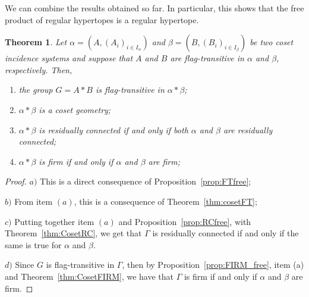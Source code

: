 \documentclass[11pt,letterpaper]{amsart}
\newtheorem{thm}[prop]{Theorem}
\begin{document}
We can combine the results obtained so far. In particular, this shows that the free product of regular hypertopes is a regular hypertope.

\begin{thm}\label{thm:FP_a)FT_b)Geo_c)_RC_b)_FIRM}
    Let $\alpha=(A,(A_i)_{i\in I_\alpha})$ and $\beta=(B,(B_i)_{i\in I_\beta})$ be two coset incidence systems and suppose that $A$ and $B$ are flag-transitive in $\alpha$ and $\beta$, respectively. Then,
\begin{enumerate}
    \item the group $G = A * B$ is flag-transitive in $\alpha*\beta$;
    \item $\alpha*\beta$ is a coset geometry;
    \item $\alpha*\beta$ is residually connected if and only if both $\alpha$ and $\beta$ are residually connected;
    \item $\alpha*\beta$ is firm if and only if $\alpha$ and $\beta$ are firm;
\end{enumerate}
\end{thm}
\begin{proof}
    $a)$ This is a direct consequence of Proposition~\ref{prop:FTfree};

    $b)$ From item $(a)$, this is a consequence of Theorem~\ref{thm:cosetFT};

    $c)$ Putting together item $(a)$ and Proposition~\ref{prop:RCfree}, with Theorem~\ref{thm:CosetRC}, we get that $\Gamma$ is residually connected if and only if the same is true for $\alpha$ and $\beta$. 

    $d)$ Since $G$ is flag-transitive in $\Gamma$, then by Proposition~\ref{prop:FIRM_free}, item (a) and Theorem~\ref{thm:CosetFIRM}, we have that $\Gamma$ is firm if and only if $\alpha$ and $\beta$ are firm.
    
\end{proof}
\end{document}
